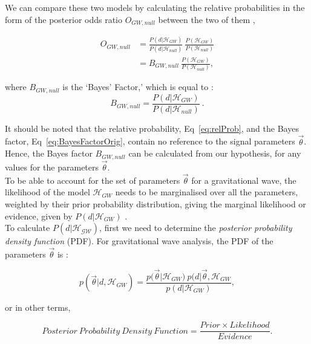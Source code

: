 \documentclass{article}
\begin{document}
 
We can compare these two models by calculating the relative probabilities in the form of the posterior odds ratio $O_{GW, null}$ between the two of them \cite{BaeStats}, 
  
  \begin{align} \label{eq:relProb}
  O_{GW, null} &= \frac{P(d|  \mathcal{H}_{GW})}{P(d|  \mathcal{H}_{null})} \  \frac{P(\mathcal{H}_{GW}) }{P(\mathcal{H}_{null})}  \nonumber\\
  &= B_{GW, null} \ \frac{P( \mathcal{H}_{GW}) }{P( \mathcal{H}_{null})},
  \end{align} 
  
   where $B_{GW, null}$ is the `Bayes' Factor,' which is equal to \cite{BaeStats}:\\
  \begin{equation} \label{eq:BayesFactorOrig}
  B_{GW, null} = \frac{P(d|  \mathcal{H}_{GW})}{P(d|  \mathcal{H}_{null})} \ .
  \end{equation}
 
It should be noted that the relative probability, Eq~\ref{eq:relProb}, and the Bayes factor, Eq~\ref{eq:BayesFactorOrig}, contain no reference to the signal parameters $\vec{\theta}$. Hence, the Bayes factor $B_{GW, null}$ can be calculated from our hypothesis, for any values for the parameters $\vec{\theta}$.\\

 To be able to account for the set of parameters $\vec{\theta}$ for a gravitational wave, the likelihood of the model $\mathcal{H}_{GW}$ needs to be marginalised over all the parameters, weighted by their prior probability distribution, giving the marginal likelihood or evidence, given by $P(d|\mathcal{H}_{GW})$  \cite{BaeStats}.\\
 

To calculate $P(d|\mathcal{H_{GW}})$, first we need to determine the \textit{posterior probability density function} (PDF). For gravitational wave analysis, the PDF of the parameters $\vec{\theta}$ is \cite{RSmith}:

\begin{equation} \label{eq:PDF}
p(\vec{\theta}|d, \mathcal{H}_{GW})  = \frac{p(\vec{\theta}| \mathcal{H}_{GW}) \ p(d|\vec{\theta},  \mathcal{H}_{GW}}  { p(d|\mathcal{H}_{GW})},
\end{equation} 

or in other terms, 

\begin{equation} \label{eq:englishTheorem}
{ Posterior \ Probability \ Density \ Function}  = \frac{ Prior  \times Likelihood}{Evidence}. \nonumber
\end{equation} 
\end{document}
